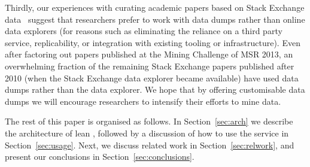 Thirdly, our experiences with curating academic papers based on Stack Exchange data~\cite{vasilescu2012meta}
suggest that researchers prefer to work with data dumps rather than online data explorers
(for reasons such as eliminating the reliance on a third party service, replicability, or integration with existing
tooling or infrastructure).
Even after factoring out papers published at the Mining Challenge of MSR 2013, an overwhelming
fraction of the remaining Stack Exchange papers published after 2010 (when the Stack Exchange data explorer
became available) have used data dumps rather than the data explorer.
We hope that by offering customisable \ght data dumps we will encourage researchers to intensify their efforts
to mine \gh data.

The rest of this paper is organised as follows.
In Section~\ref{sec:arch} we describe the architecture of lean \ght, followed by a discussion of how to use the
service in Section~\ref{sec:usage}.
Next, we discuss related work in Section~\ref{sec:relwork}, and present our conclusions in Section~\ref{sec:conclusions}.

